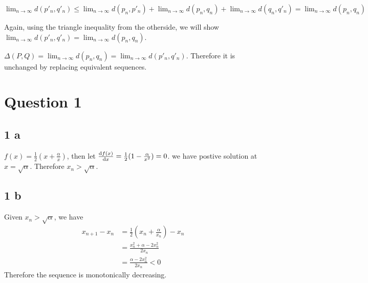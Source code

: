 \documentclass{article}
\begin{document}
$ \lim_{n\rightarrow \infty} d(p'_n, q'_n) \leq \lim_{n\rightarrow \infty} d(p_n, p'_n) + \lim_{n\rightarrow \infty} d(p_n, q_n) + \lim_{n\rightarrow \infty} d(q_n, q'_n) =  \lim_{n\rightarrow \infty} d(p_n, q_n)$

Again, using the triangle inequality from the otherside, we will show $\lim_{n\rightarrow \infty} d(p'_n, q'_n) = \lim_{n\rightarrow \infty} d(p_n, q_n)$.

$\Delta (P,Q) = \lim_{n\rightarrow \infty} d(p_n, q_n) = \lim_{n\rightarrow \infty} d(p'_n, q'_n)$. Therefore it is unchanged by replacing equivalent sequences.

\section*{Question 1}
\subsection*{1 a}

$f(x) =  \frac{1}{2} (x + \frac{\alpha}{x})$, then let $\dv{f(x)}{x} = \frac{1}{2} (1 - \frac{\alpha}{x^2})= 0$.  we have postive solution at $ x = \sqrt{\alpha}$.
Therefore $x_n> \sqrt{\alpha} $.

\subsection*{1 b}
Given $x_n > \sqrt{\alpha}$, we have
\begin{equation}
  \begin{split}
    x_{n+1} - x_n &= \frac{1}{2} (x_n + \frac{\alpha}{x_n})- x_n\\
    &= \frac{x_n^2 + \alpha - 2 x_n^2}{2 x_n}\\
    &= \frac{\alpha - 2 x_n^2}{2 x_n} < 0
  \end{split}
\end{equation}
Therefore the sequence is monotonically decreasing.
\end{document}
